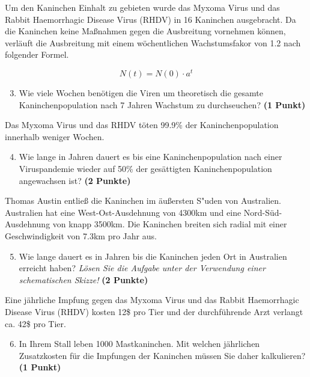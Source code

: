 \documentclass[a4paper, 9pt]{scrartcl}\usepackage[]{graphicx}\usepackage[]{xcolor}
\begin{document}
Um den Kaninchen Einhalt zu gebieten wurde das Myxoma Virus und das Rabbit
Haemorrhagic Disease Virus (RHDV) in 16 Kaninchen
ausgebracht. Da die Kaninchen keine Ma{\ss}nahmen gegen die Ausbreitung
vornehmen k{\"o}nnen, verl{\"a}uft die Ausbreitung mit einem w{\"o}chentlichen
Wachstumsfakor von 1.2 nach folgender Formel.

\begin{equation*}
  N(t) = N(0) \cdot a^t
\end{equation*}

\begin{enumerate}
  \setcounter{enumi}{2}
\item Wie viele Wochen ben{\"o}tigen die Viren um theoretisch die gesamte
  Kaninchenpopulation nach 7 Jahren Wachstum zu
  durchseuchen? \textbf{(1 Punkt)}
\end{enumerate}

Das Myxoma Virus und das RHDV t{\"o}ten 99.9\% der
Kaninchenpopulation innerhalb weniger Wochen.

\begin{enumerate}
  \setcounter{enumi}{3}  
\item Wie lange in Jahren dauert es bis eine Kaninchenpopulation nach einer
  Viruspandemie wieder auf 50\% der ges{\"a}ttigten
  Kaninchenpopulation angewachsen ist?  \textbf{(2 Punkte)}
\end{enumerate}

Thomas Austin entlie{\ss} die Kaninchen im {\"a}u{\ss}ersten S{"u}den von
Australien. Australien hat eine West-Ost-Ausdehnung von 4300km
und eine Nord-S{\"u}d-Ausdehnung von knapp 3500km. Die Kaninchen
breiten sich radial mit einer Geschwindigkeit von 7.3km pro
Jahr aus.

\begin{enumerate}
  \setcounter{enumi}{4}
\item Wie lange dauert es in Jahren bis die Kaninchen jeden Ort
  in Australien erreicht haben? \textit{L{\"o}sen Sie die Aufgabe unter der
    Verwendung einer schematischen Skizze!} \textbf{(2 Punkte)}
\end{enumerate}

Eine j{\"a}hrliche Impfung gegen das Myxoma Virus und das Rabbit Haemorrhagic
Disease Virus (RHDV) kosten 12\$ pro Tier und der
durchf{\"u}hrende Arzt verlangt ca. 42\$ pro Tier.

\begin{enumerate}
  \setcounter{enumi}{5}
\item In Ihrem Stall leben 1000 Mastkaninchen. Mit welchen
  j{\"a}hrlichen Zusatzkosten f{\"u}r die Impfungen der Kaninchen m{\"u}ssen Sie daher
  kalkulieren? \textbf{(1 Punkt)}
\end{enumerate}
 
\end{document}
